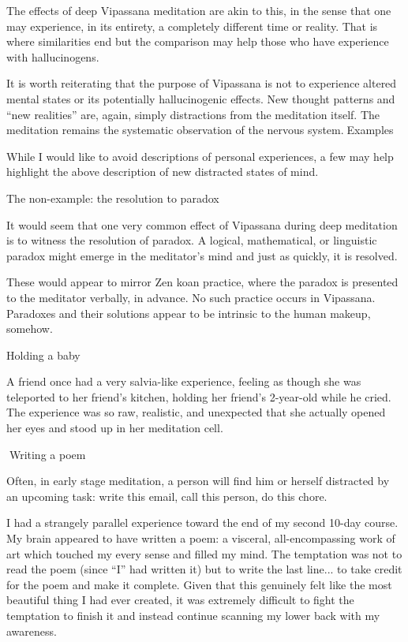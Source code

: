 \documentclass{article}
\begin{document}
The effects of deep Vipassana meditation are akin to this, in the sense that one may experience, in its entirety, a completely different time or reality. That is where similarities end but the comparison may help those who have experience with hallucinogens.

It is worth reiterating that the purpose of Vipassana is not to experience altered mental states or its potentially hallucinogenic effects. New thought patterns and ``new realities'' are, again, simply distractions from the meditation itself. The meditation remains the systematic observation of the nervous system.Examples


While I would like to avoid descriptions of personal experiences, a few may help highlight the above description of new distracted states of mind.

The non-example:
the resolution to paradox

It would seem that one very common effect of Vipassana during deep meditation is to witness the resolution of paradox. A logical, mathematical, or linguistic paradox might emerge in the meditator's mind and just as quickly, it is resolved.

These would appear to mirror Zen koan practice, where the paradox is presented to the meditator verbally, in advance. No such practice occurs in Vipassana. Paradoxes and their solutions appear to be intrinsic to the human makeup, somehow.

Holding a baby

A friend once had a very salvia-like experience, feeling as though she was teleported to her friend's kitchen, holding her friend's 2-year-old while he cried. The experience was so raw, realistic, and unexpected that she actually opened her eyes and stood up in her meditation cell.

Writing a poem

Often, in early stage meditation, a person will find him or herself distracted by an upcoming task: write this email, call this person, do this chore.

I had a strangely parallel experience toward the end of my second 10-day course. My brain appeared to have written a poem: a visceral, all-encompassing work of art which touched my every sense and filled my mind. The temptation was not to read the poem (since ``I'' had written it) but to write the last line... to take credit for the poem and make it complete. Given that this genuinely felt like the most beautiful thing I had ever created, it was extremely difficult to fight the temptation to finish it and instead continue scanning my lower back with my awareness.
\end{document}
